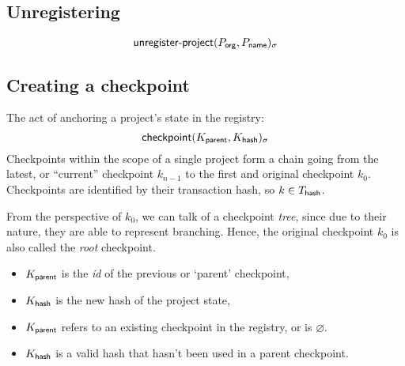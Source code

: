 \subsection{Unregistering}
\[
    \operatorname{\mathsf{unregister-project}}\lparen P_{\mathsf{org}}, P_{\mathsf{name}}\rparen_\sigma
\]



\subsection{Creating a checkpoint}
\label{s:checkpoint}
The act of anchoring a project's state in the registry:
\[
    \operatorname{\mathsf{checkpoint}}\lparen K_{\mathsf{parent}}, K_{\mathsf{hash}}\rparen_\sigma
\]
Checkpoints within the scope of a single project form a chain going from the
latest, or ``current'' checkpoint $k_{n-1}$ to the first and original
checkpoint $k_0$. Checkpoints are identified by their transaction hash,
so $k \in T_{\mathsf{hash}}$.

From the perspective of $k_0$, we can talk of a checkpoint \emph{tree}, since
due to their nature, they are able to represent branching. Hence, the original
checkpoint $k_0$ is also called the \emph{root} checkpoint.

\begin{itemize}
    \item $K_{\mathsf{parent}}$ is the \emph{id} of the previous or `parent' checkpoint,
    \item $K_{\mathsf{hash}}$ is the new hash of the project state,
\end{itemize}
\validation
\begin{itemize}
    \item{$K_{\mathsf{parent}}$ refers to an existing checkpoint in the registry,
        or is $\varnothing$.}
    \item{$K_{\mathsf{hash}}$ is a valid hash that hasn't been used in a parent
        checkpoint.}
\end{itemize}

